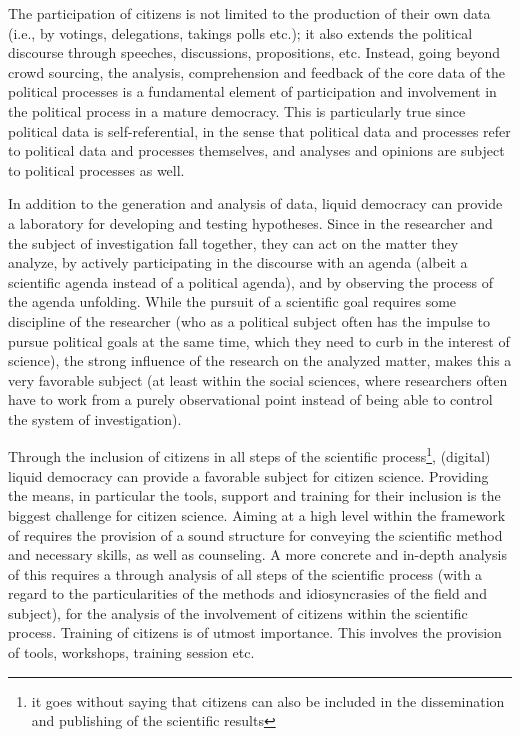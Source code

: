 The participation of citizens is not limited to the production of their own data (i.e., by votings, delegations, takings polls etc.); it also extends the political discourse through speeches, discussions, propositions, etc. Instead, going beyond crowd sourcing, the analysis, comprehension and feedback of the core data of the political processes is a fundamental element of participation and involvement in the political process in a mature democracy. This is particularly true since political data is self-referential, in the sense that political data and processes refer to political data and processes themselves, and analyses and opinions are subject to political processes as well.

In addition to the generation and analysis of data, liquid democracy can provide a laboratory for developing and testing hypotheses. Since in  the researcher and the subject of investigation fall together, they can act on the matter they analyze, by actively participating in the discourse with an agenda (albeit a scientific agenda instead of a political agenda), and by observing the process of the agenda unfolding. While the pursuit of a scientific goal requires some discipline of the researcher (who as a political subject often has the impulse to pursue political goals at the same time, which they need to curb in the interest of science), the strong influence of the research on the analyzed matter, makes this a very favorable subject (at least within the social sciences, where researchers often have to work from a purely observational point instead of being able to control the system of investigation). 

Through the inclusion of citizens in all steps of the scientific process\footnote{it goes without saying that citizens can also be included in the dissemination and publishing of the scientific results}, (digital) liquid democracy can provide a favorable subject for citizen science. Providing the means, in particular the tools, support and training for their inclusion is the biggest challenge for citizen science. Aiming at a high level within the framework of \textcite{Hakalay2014} requires the provision of a sound structure for conveying the scientific method and necessary skills, as well as counseling. A more concrete and in-depth analysis of this requires a through analysis of all steps of the scientific process (with a regard to the particularities of the methods and idiosyncrasies of the field and subject), for the analysis of the involvement of citizens within the scientific process. Training of citizens is of utmost importance. This involves the provision of tools, workshops, training session etc. 

